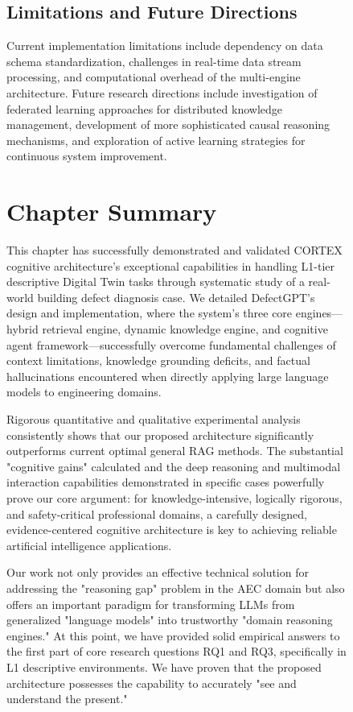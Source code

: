 \begin{figure}[htbp]
\subsection{Limitations and Future Directions}

Current implementation limitations include dependency on data schema standardization, challenges in real-time data stream processing, and computational overhead of the multi-engine architecture. Future research directions include investigation of federated learning approaches for distributed knowledge management, development of more sophisticated causal reasoning mechanisms, and exploration of active learning strategies for continuous system improvement.

\section{Chapter Summary}

This chapter has successfully demonstrated and validated CORTEX cognitive architecture's exceptional capabilities in handling L1-tier descriptive Digital Twin tasks through systematic study of a real-world building defect diagnosis case. We detailed DefectGPT's design and implementation, where the system's three core engines—hybrid retrieval engine, dynamic knowledge engine, and cognitive agent framework—successfully overcome fundamental challenges of context limitations, knowledge grounding deficits, and factual hallucinations encountered when directly applying large language models to engineering domains.

Rigorous quantitative and qualitative experimental analysis consistently shows that our proposed architecture significantly outperforms current optimal general RAG methods. The substantial "cognitive gains" calculated and the deep reasoning and multimodal interaction capabilities demonstrated in specific cases powerfully prove our core argument: for knowledge-intensive, logically rigorous, and safety-critical professional domains, a carefully designed, evidence-centered cognitive architecture is key to achieving reliable artificial intelligence applications.

Our work not only provides an effective technical solution for addressing the "reasoning gap" problem in the AEC domain but also offers an important paradigm for transforming LLMs from generalized "language models" into trustworthy "domain reasoning engines." At this point, we have provided solid empirical answers to the first part of core research questions RQ1 and RQ3, specifically in L1 descriptive environments. We have proven that the proposed architecture possesses the capability to accurately "see and understand the present."


\end{figure}
